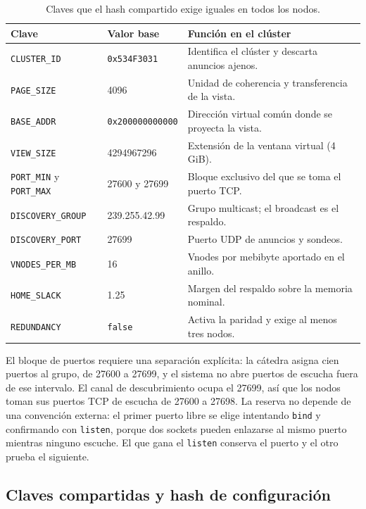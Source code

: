 \begin{table}[H]
\centering
\small
\begin{tabularx}{\linewidth}{l l Y}
\toprule
\textbf{Clave} & \textbf{Valor base} & \textbf{Función en el clúster} \\
\midrule
\texttt{CLUSTER\_ID} & \texttt{0x534F3031} & Identifica el clúster y descarta anuncios ajenos. \\
\texttt{PAGE\_SIZE} & 4096 & Unidad de coherencia y transferencia de la vista. \\
\texttt{BASE\_ADDR} & \texttt{0x200000000000} & Dirección virtual común donde se proyecta la vista. \\
\texttt{VIEW\_SIZE} & 4294967296 & Extensión de la ventana virtual (4 GiB). \\
\texttt{PORT\_MIN} y \texttt{PORT\_MAX} & 27600 y 27699 & Bloque exclusivo del que se toma el puerto TCP. \\
\texttt{DISCOVERY\_GROUP} & 239.255.42.99 & Grupo multicast; el broadcast es el respaldo. \\
\texttt{DISCOVERY\_PORT} & 27699 & Puerto UDP de anuncios y sondeos. \\
\texttt{VNODES\_PER\_MB} & 16 & Vnodes por mebibyte aportado en el anillo. \\
\texttt{HOME\_SLACK} & 1.25 & Margen del respaldo sobre la memoria nominal. \\
\texttt{REDUNDANCY} & \texttt{false} & Activa la paridad y exige al menos tres nodos. \\
\bottomrule
\end{tabularx}
\caption{Claves que el hash compartido exige iguales en todos los nodos.}
\label{tab:claves-compartidas}
\end{table}

El bloque de puertos requiere una separación explícita: la cátedra asigna cien puertos al grupo, de 27600 a 27699, y el sistema no abre puertos de escucha fuera de ese intervalo. El canal de descubrimiento ocupa el 27699, así que los nodos toman sus puertos TCP de escucha de 27600 a 27698. La reserva no depende de una convención externa: el primer puerto libre se elige intentando \texttt{bind} y confirmando con \texttt{listen}, porque dos sockets pueden enlazarse al mismo puerto mientras ninguno escuche. El que gana el \texttt{listen} conserva el puerto y el otro prueba el siguiente.

\subsection{Claves compartidas y hash de configuración}

